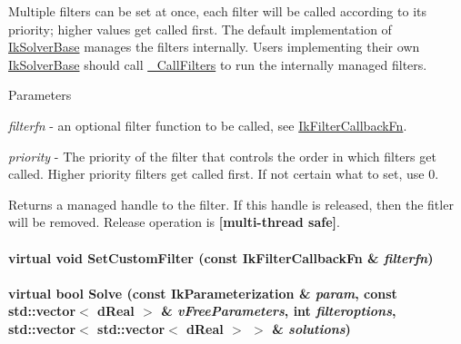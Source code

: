 Multiple filters can be set at once, each filter will be called according to its priority; higher values get called first. The default implementation of \hyperlink{classOpenRAVE_1_1IkSolverBase}{IkSolverBase} manages the filters internally. Users implementing their own \hyperlink{classOpenRAVE_1_1IkSolverBase}{IkSolverBase} should call \hyperlink{classOpenRAVE_1_1IkSolverBase_a5da49b954a8094d7d1a7525ff293496c}{\_\-CallFilters} to run the internally managed filters. 
\begin{DoxyParams}{Parameters}
\item[{\em filterfn}]-\/ an optional filter function to be called, see \hyperlink{classOpenRAVE_1_1IkSolverBase_a2f7085e3e716d58bbbc95fa53926313e}{IkFilterCallbackFn}. \item[{\em priority}]-\/ The priority of the filter that controls the order in which filters get called. Higher priority filters get called first. If not certain what to set, use 0. \end{DoxyParams}
\begin{DoxyReturn}{Returns}
a managed handle to the filter. If this handle is released, then the fitler will be removed. Release operation is {\bfseries \mbox{[}multi-\/thread safe\mbox{]}}. 
\end{DoxyReturn}
\hypertarget{classOpenRAVE_1_1IkSolverBase_adda44b94bfdbdee2cc57341d6fdef299}{
\paragraph[{SetCustomFilter}]{\setlength{\rightskip}{0pt plus 5cm}virtual void SetCustomFilter (const {\bf IkFilterCallbackFn} \& {\em filterfn})}\hfill}
\label{classOpenRAVE_1_1IkSolverBase_adda44b94bfdbdee2cc57341d6fdef299}
\hypertarget{classOpenRAVE_1_1IkSolverBase_a4f2dd26ce9c4f52cc27f09545faa159b}{
\paragraph[{Solve}]{\setlength{\rightskip}{0pt plus 5cm}virtual bool Solve (const {\bf IkParameterization} \& {\em param}, \/  const std::vector$<$ dReal $>$ \& {\em vFreeParameters}, \/  int {\em filteroptions}, \/  std::vector$<$ std::vector$<$ dReal $>$ $>$ \& {\em solutions})}\hfill}
\label{classOpenRAVE_1_1IkSolverBase_a4f2dd26ce9c4f52cc27f09545faa159b}


